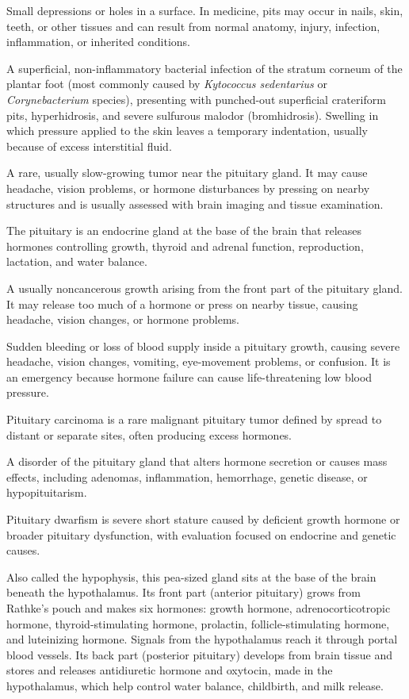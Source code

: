  Small depressions or holes in a surface. In medicine, pits may occur in nails, skin, teeth, or other tissues and can result from normal anatomy, injury, infection, inflammation, or inherited conditions.

 A superficial, non-inflammatory bacterial infection of the stratum corneum of the plantar foot (most commonly caused by \textit{Kytococcus sedentarius} or \textit{Corynebacterium} species), presenting with punched-out superficial crateriform pits, hyperhidrosis, and severe sulfurous malodor (bromhidrosis).
 Swelling in which pressure applied to the skin leaves a temporary indentation, usually because of excess interstitial fluid.

 A rare, usually slow-growing tumor near the pituitary gland. It may cause headache, vision problems, or hormone disturbances by pressing on nearby structures and is usually assessed with brain imaging and tissue examination.

 The pituitary is an endocrine gland at the base of the brain that releases hormones controlling growth, thyroid and adrenal function, reproduction, lactation, and water balance.

 A usually noncancerous growth arising from the front part of the pituitary gland. It may release too much of a hormone or press on nearby tissue, causing headache, vision changes, or hormone problems.

 Sudden bleeding or loss of blood supply inside a pituitary growth, causing severe headache, vision changes, vomiting, eye-movement problems, or confusion. It is an emergency because hormone failure can cause life-threatening low blood pressure.

 Pituitary carcinoma is a rare malignant pituitary tumor defined by spread to distant or separate sites, often producing excess hormones.

 A disorder of the pituitary gland that alters hormone secretion or causes mass effects, including adenomas, inflammation, hemorrhage, genetic disease, or hypopituitarism.

 Pituitary dwarfism is severe short stature caused by deficient growth hormone or broader pituitary dysfunction, with evaluation focused on endocrine and genetic causes.

 Also called the hypophysis, this pea-sized gland sits at the base of the
brain beneath the hypothalamus. Its front part (anterior pituitary) grows from Rathke's pouch and
makes six hormones: growth hormone, adrenocorticotropic hormone, thyroid-stimulating hormone,
prolactin, follicle-stimulating hormone, and luteinizing hormone. Signals from the hypothalamus reach
it through portal blood vessels. Its back part (posterior pituitary) develops from brain tissue and
stores and releases antidiuretic hormone and oxytocin, made in the hypothalamus, which help control
water balance, childbirth, and milk release.

